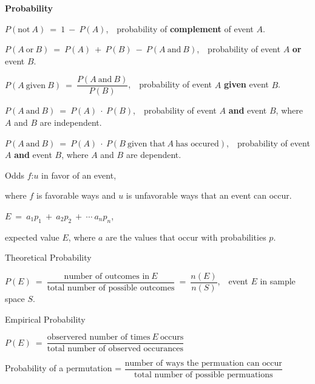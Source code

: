 \documentclass{article}
\begin{document}
\begin{large}
\textbf{Probability}

\hspace{0.1in} $P(\text{not}\ A)\ =\ 1\ -\ P(A)$,\ \ probability of \textbf{complement} of event $A$.

\hspace{0.1in} $P(A\ \text{or}\ B)\ =\ P(A)\ +\ P(B)\ -\ P(A\ \text{and}\ B)$,\ \ probability of event $A$ \textbf{or} event $B$.

\hspace{0.1in} $P(A\ \text{given}\ B)\ =\ \dfrac{P(A\ \text{and}\ B)}{P(B)}$,\ \ probability of event $A$ \textbf{given} event $B$.

\hspace{0.1in} $P(A\ \text{and}\ B)\ =\ P(A)\ \cdot\ P(B)$,\ \ probability of event $A$ \textbf{and} event $B$, where $A$ and $B$ are independent.

\hspace{0.1in} $P(A\ \text{and}\ B)\ =\ P(A)\ \cdot\ P(B\ \text{given that}\ A\ \text{has occured})$,\ \ probability of event $A$ \textbf{and} event $B$, where $A$ and $B$ are dependent.

\hspace{0.1in} Odds $f$:$u$ in favor of an event,\ \ \begin{large}where $f$ is favorable ways and $u$ is unfavorable ways that an event can occur.\end{large}

\vspace{-0.1in}
\hspace{0.1in} $E\ =\ a_{1}p_{1}\ +\ a_{2}p_{2}\ +\ \cdots\ a_{n}p_{n}$,\ \ \begin{large}expected value $E$, where $a$ are the values that occur with probabilities $p$.\end{large}

\hspace{0.1in} Theoretical Probability

\hspace{0.5in} $P(E)\ =\ \dfrac{\text{number of outcomes in}\ E}{\text{total number of possible outcomes}}\ =\ \dfrac{n(E)}{n(S)}$,\ \ event $E$ in sample space $S$.

\hspace{0.1in} Empirical Probability

\hspace{0.5in} $P(E)\ =\ \dfrac{\text{observered number of times}\ E\ \text{occurs}}{\text{total number of observed occurances}}$

\vspace{0.1in}
\hspace{0.1in} Probability of a permutation = $\dfrac{\text{number of ways the permuation can occur}}{\text{total number of possible permuations}}$


\end{large}
\end{document}
